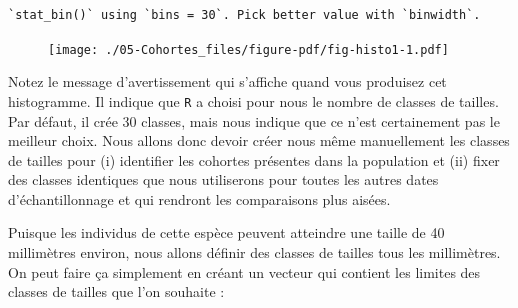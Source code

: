\documentclass[
  a4paper,
  DIV=11,
  numbers=noendperiod,
  oneside]{scrreprt}
\newenvironment{Shaded}{}{}
\newcommand{\AttributeTok}[1]{\textcolor[rgb]{0.84,0.23,0.29}{#1}}
\newcommand{\CommentTok}[1]{\textcolor[rgb]{0.42,0.45,0.49}{#1}}
\newcommand{\ConstantTok}[1]{\textcolor[rgb]{0.00,0.36,0.77}{#1}}
\newcommand{\FunctionTok}[1]{\textcolor[rgb]{0.44,0.26,0.76}{#1}}
\newcommand{\NormalTok}[1]{\textcolor[rgb]{0.14,0.16,0.18}{#1}}
\newcommand{\OtherTok}[1]{\textcolor[rgb]{0.44,0.26,0.76}{#1}}
\newcommand{\SpecialCharTok}[1]{\textcolor[rgb]{0.00,0.36,0.77}{#1}}
\begin{document}
\begin{verbatim}
`stat_bin()` using `bins = 30`. Pick better value with `binwidth`.
\end{verbatim}

\begin{figure}[H]


{\centering \texttt{[image: ./05-Cohortes\_files/figure-pdf/fig-histo1-1.pdf]}

}

\end{figure}


Notez le message d'avertissement qui s'affiche quand vous produisez cet
histogramme. Il indique que \texttt{R} a choisi pour nous le nombre de
classes de tailles. Par défaut, il crée 30 classes, mais nous indique
que ce n'est certainement pas le meilleur choix. Nous allons donc devoir
créer nous même manuellement les classes de tailles pour (i) identifier
les cohortes présentes dans la population et (ii) fixer des classes
identiques que nous utiliserons pour toutes les autres dates
d'échantillonnage et qui rendront les comparaisons plus aisées.

Puisque les individus de cette espèce peuvent atteindre une taille de 40
millimètres environ, nous allons définir des classes de tailles tous les
millimètres. On peut faire ça simplement en créant un vecteur qui
contient les limites des classes de tailles que l'on souhaite :

\begin{Shaded}
\end{Shaded}
\end{document}
